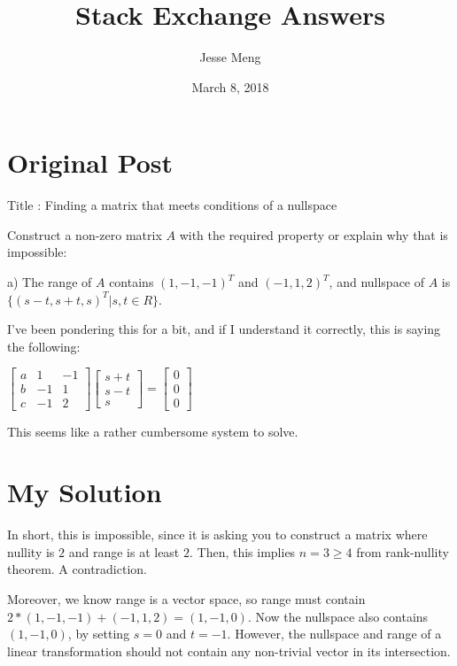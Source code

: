 \documentclass{article}
\title{Stack Exchange Answers}
\author{Jesse Meng }
\date{March 8, 2018}
\begin{document}
\maketitle

\section{Original Post}
Title : Finding a matrix that meets conditions of a nullspace

Construct a non-zero matrix $A$ with the required property or explain why that is impossible:  

a) The range of $A$ contains $(1, −1, −1)^T$ and $(−1, 1, 2)^T$, and nullspace of $A$ is $\{(s−t, s+t,s)^T|s, t \in R\}$.  

I've been pondering this for a bit, and if I understand it correctly, this is saying the following:

$\begin{bmatrix}a & 1 &-1\\b & -1 & 1\\c & -1 & 2 \end{bmatrix}$$  \begin{bmatrix} s+t \\ s-t \\s \end{bmatrix}= \begin{bmatrix} 0\\ 0 \\0 \end{bmatrix}$

This seems like a rather cumbersome system to solve.
\section{My Solution}
In short, this is impossible, since it is asking you to construct a matrix where nullity is $2$ and range is at least $2$. Then, this implies $n=3\geq 4$ from rank-nullity theorem. A contradiction.

Moreover, we know range is a vector space, so range must contain $2*(1,-1,-1)+(-1,1,2)=(1,-1,0)$. Now the nullspace also contains $(1,-1,0)$, by setting $s=0$ and $t=-1$. However, the nullspace and range of a linear transformation should not contain any non-trivial vector in its intersection.
\end{document}
